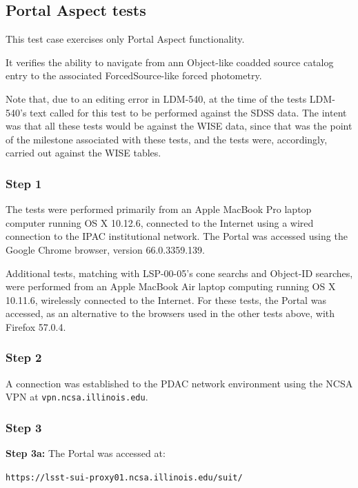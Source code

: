 
\subsection{Portal Aspect tests}

This test case exercises only Portal Aspect functionality.

It verifies the ability to navigate from ann Object-like coadded source catalog entry to the associated ForcedSource-like forced photometry.

Note that, due to an editing error in LDM-540,
at the time of the tests LDM-540's text called for this test to be performed against the SDSS data.
The intent was that all these tests would be against the WISE data,
since that was the point of the milestone associated with these tests,
and the tests were, accordingly, carried out against the WISE tables.

\subsubsection{Step 1}

The tests were performed primarily from an Apple MacBook Pro laptop computer running OS X 10.12.6,
connected to the Internet using a wired connection to the IPAC institutional network.
The Portal was accessed using the Google Chrome browser, version 66.0.3359.139.

Additional tests, matching with LSP-00-05's cone searchs and Object-ID searches,
were performed from an Apple MacBook Air laptop computing running OS X 10.11.6,
wirelessly connected to the Internet.
For these tests, the Portal was accessed, as an alternative to the browsers used in the other tests above,
with Firefox 57.0.4.

\subsubsection{Step 2}

A connection was established to the PDAC network environment using the NCSA VPN at \texttt{vpn.ncsa.illinois.edu}.

\subsubsection{Step 3}

\textbf{Step 3a:} The Portal was accessed at:

\begin{center}
\texttt{https://lsst-sui-proxy01.ncsa.illinois.edu/suit/}
\end{center}

